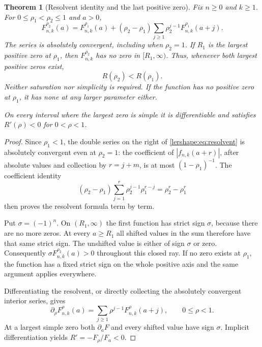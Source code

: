 \documentclass[11pt,a4paper]{article}
\numberwithin{equation}{section}
\newtheorem{theorem}{Theorem}[section]
\theoremstyle{definition}
\theoremstyle{remark}
\begin{document}
\begin{theorem}[Resolvent identity and the last positive zero]
\label{lershape:thm:resolvent}
Fix $n\geq0$ and $k\geq1$. For $0\leq\rho_1<\rho_2\leq1$ and $a>0$,
\begin{equation}\label{lershape:eq:resolvent}
 F_{n,k}^{\rho_2}(a)=F_{n,k}^{\rho_1}(a)
 +(\rho_2-\rho_1)\sum_{j\geq1}\rho_2^{j-1}
 F_{n,k}^{\rho_1}(a+j).
\end{equation}
The series is absolutely convergent, including when $\rho_2=1$.
If $R_1$ is the largest positive zero at $\rho_1$, then
$F_{n,k}^{\rho_2}$ has no zero in $[R_1,\infty)$. Thus, whenever both
largest positive zeros exist,
\begin{equation}\label{lershape:eq:last-order}
 R(\rho_2)<R(\rho_1).
\end{equation}
Neither saturation nor simplicity is required. If the function has no
positive zero at $\rho_1$, it has none at any larger parameter either.

On every interval where the largest zero is simple it is differentiable
and satisfies $R'(\rho)<0$ for $0<\rho<1$.
\end{theorem}

\begin{proof}
Since $\rho_1<1$, the double series on the right of
\eqref{lershape:eq:resolvent} is absolutely convergent even at
$\rho_2=1$: the coefficient of $|f_{n,k}(a+r)|$, after absolute values
and collection by $r=j+m$, is at most $(1-\rho_1)^{-1}$.
The coefficient identity
\[
 (\rho_2-\rho_1)\sum_{j=1}^r\rho_2^{j-1}\rho_1^{r-j}
 =\rho_2^r-\rho_1^r
\]
then proves the resolvent formula term by term.

Put $\sigma=(-1)^n$. On $(R_1,\infty)$ the first function has
strict sign $\sigma$, because there are no more zeros. At every
$a\geq R_1$ all shifted values in the sum therefore have that same
strict sign. The unshifted value is either of sign $\sigma$ or zero.
Consequently $\sigma F_{n,k}^{\rho_2}(a)>0$ throughout this closed
ray. If no zero exists at $\rho_1$, the function has a fixed strict
sign on the whole positive axis and the same argument applies everywhere.

Differentiating the resolvent, or directly collecting the absolutely
convergent interior series, gives
\begin{equation}\label{lershape:eq:parameter-resolvent}
 \partial_\rho F_{n,k}^{\rho}(a)
 =\sum_{j\geq1}\rho^{j-1}F_{n,k}^{\rho}(a+j),\qquad 0\leq\rho<1.
\end{equation}
At a largest simple zero both $\partial_a F$ and every shifted value
have sign $\sigma$. Implicit differentiation yields
$R'=-F_\rho/F_a<0$.
\end{proof}
\end{document}
